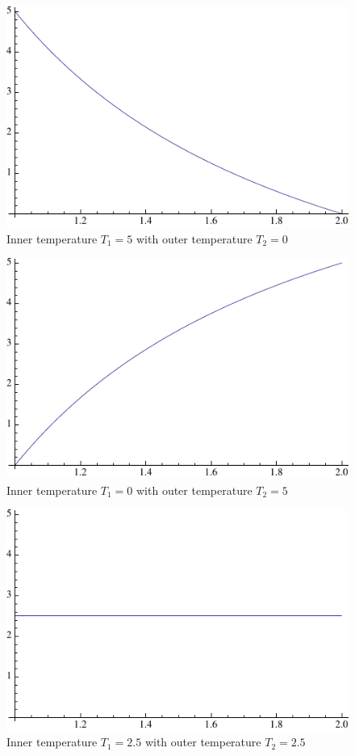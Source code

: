 \documentclass[12pt]{article}
\begin{document}
\begin{figure}[htp]
\centering
\includegraphics{5to0.pdf}
\caption{Inner temperature $T_1=5$ with outer temperature $T_2=0$}\label{fig:5to0}
\end{figure}

\begin{figure}[htp]
\centering
\includegraphics{0to5.pdf}
\caption{Inner temperature $T_1=0$ with outer temperature $T_2=5$}\label{fig:0to5}
\end{figure}

\begin{figure}[htp]
\centering
\includegraphics{flat.pdf}
\caption{Inner temperature $T_1=2.5$ with outer temperature $T_2=2.5$}\label{fig:flat}
\end{figure}
\end{document}
